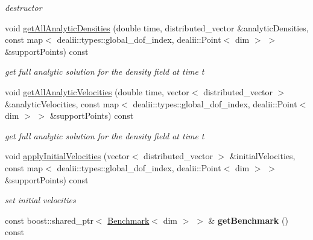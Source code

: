 \begin{DoxyCompactItemize}
\begin{DoxyCompactList}\small\item\em destructor \item\end{DoxyCompactList}\item 
\hypertarget{classnatrium_1_1BenchmarkCFDSolver_a486d464112256436c1c3300b28519cbb}{
void \hyperlink{classnatrium_1_1BenchmarkCFDSolver_a486d464112256436c1c3300b28519cbb}{getAllAnalyticDensities} (double time, distributed\_\-vector \&analyticDensities, const map$<$ dealii::types::global\_\-dof\_\-index, dealii::Point$<$ dim $>$ $>$ \&supportPoints) const }
\label{classnatrium_1_1BenchmarkCFDSolver_a486d464112256436c1c3300b28519cbb}

\begin{DoxyCompactList}\small\item\em get full analytic solution for the density field at time t \item\end{DoxyCompactList}\item 
\hypertarget{classnatrium_1_1BenchmarkCFDSolver_aebef5814f8c44ab8d0029114b5998cff}{
void \hyperlink{classnatrium_1_1BenchmarkCFDSolver_aebef5814f8c44ab8d0029114b5998cff}{getAllAnalyticVelocities} (double time, vector$<$ distributed\_\-vector $>$ \&analyticVelocities, const map$<$ dealii::types::global\_\-dof\_\-index, dealii::Point$<$ dim $>$ $>$ \&supportPoints) const }
\label{classnatrium_1_1BenchmarkCFDSolver_aebef5814f8c44ab8d0029114b5998cff}

\begin{DoxyCompactList}\small\item\em get full analytic solution for the density field at time t \item\end{DoxyCompactList}\item 
void \hyperlink{classnatrium_1_1BenchmarkCFDSolver_a7883dcfd4469ae65ae62cad09ae5d160}{applyInitialVelocities} (vector$<$ distributed\_\-vector $>$ \&initialVelocities, const map$<$ dealii::types::global\_\-dof\_\-index, dealii::Point$<$ dim $>$ $>$ \&supportPoints) const 
\begin{DoxyCompactList}\small\item\em set initial velocities \item\end{DoxyCompactList}\item 
\hypertarget{classnatrium_1_1BenchmarkCFDSolver_a767bb620c883abad0091a9e68aee4491}{
const boost::shared\_\-ptr$<$ \hyperlink{classnatrium_1_1Benchmark}{Benchmark}$<$ dim $>$ $>$ \& {\bfseries getBenchmark} () const }
\label{classnatrium_1_1BenchmarkCFDSolver_a767bb620c883abad0091a9e68aee4491}


\end{DoxyCompactItemize}
